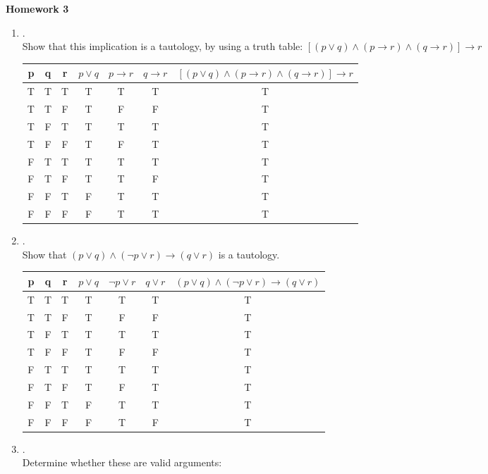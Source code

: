 \documentclass{article}
\theoremstyle{definition}
\theoremstyle{plain}
\begin{document}
\begin{center} \bf \LARGE Homework 3\\
\end{center}


\begin {enumerate}[itemindent=30pt,label=\bf Exercise {\arabic*}:]

\item .\\
Show that this implication is a tautology, by using a truth table:
\subitem \qquad $[(p \lor q) \land (p \to r) \land (q \to r)] \to r$
\subitem 
\begin{tabular}{| c | c | c | c | c | c | c |}
	\hline 
	p & q & r & $p \lor q$ & $p \to r$ & $ q \to r$ & $[(p \lor q) \land (p \to r) \land (q \to r)] \to r$\\
	\hline
	T & T & T & T & T & T & T\\
	\hline	
	T & T & F & T & F & F & T\\
	\hline 
	T & F & T & T & T & T & T \\
	\hline	
	T & F & F & T & F & T & T\\
	\hline 
	F & T & T & T & T & T & T\\
	\hline	
	F & T & F & T & T & F & T\\
	\hline
	F & F & T & F & T & T & T\\
	\hline
	F & F & F & F & T & T & T\\
	\hline
\end{tabular}
\item .\\
Show that $(p \lor q) \land (\neg p \lor r) \to (q \lor r)$ is a tautology.
\subitem 
\begin{tabular}{| c | c | c | c | c | c | c |}
	\hline 
	p & q & r & $p \lor q$ & $\neg p \lor r$ & $ q \lor r$ & $(p \lor q) \land (\neg p \lor r) \to (q \lor r)$\\
	\hline
	T & T & T & T & T & T & T\\
	\hline	
	T & T & F & T & F & F & T\\
	\hline 
	T & F & T & T & T & T & T \\
	\hline	
	T & F & F & T & F & F & T\\
	\hline 
	F & T & T & T & T & T & T\\
	\hline	
	F & T & F & T & F & T & T\\
	\hline
	F & F & T & F & T & T & T\\
	\hline
	F & F & F & F & T & F & T\\
	\hline
\end{tabular}
\item .\\
Determine whether these are valid arguments:

\end{enumerate}
\end{document}
